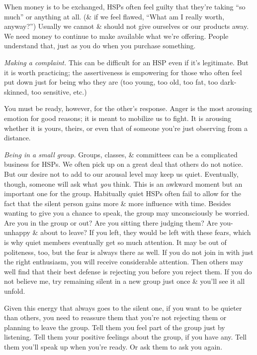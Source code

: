 \documentclass{article}
\numberwithin{equation}{section}
\begin{document}
When money is to be exchanged, HSPs often feel guilty that they're taking ``so much'' or anything at all. (\& if we feel flawed, ``What am I really worth, anyway?'') Usually we cannot \& should not give ourselves or our products away. We need money to continue to make available what we're offering. People understand that, just as you do when you purchase something.

\textit{Making a complaint.} This can be difficult for an HSP even if it's legitimate. But it is worth practicing; the assertiveness is empowering for those who often feel put down just for being who they are (too young, too old, too fat, too dark-skinned, too sensitive, etc.)

You must be ready, however, for the other's response. Anger is the most arousing emotion for good reasons; it is meant to mobilize us to fight. It is arousing whether it is yours, theirs, or even that of someone you're just observing from a distance.

\textit{Being in a small group.} Groups, classes, \& committees can be a complicated business for HSPs. We often pick up on a great deal that others do not notice. But our desire not to add to our arousal level may keep us quiet. Eventually, though, someone will ask what \textit{you} think. This is an awkward moment but an important one for the group. Habitually quiet HSPs often fail to allow for the fact that the silent person gains more \& more influence with time. Besides wanting to give you a chance to speak, the group may unconsciously be worried. Are you in the group or out? Are you sitting there judging them? Are you-unhappy \& about to leave? If you left, they would be left with these fears, which is why quiet members eventually get so much attention. It may be out of politeness, too, but the fear is always there as well. If you do not join in with just the right enthusiasm, you will receive considerable attention. Then others may well find that their best defense is rejecting you before you reject them. If you do not believe me, try remaining silent in a new group just once \& you'll see it all unfold.

Given this energy that always goes to the silent one, if you want to be quieter than others, you need to reassure them that you're not rejecting them or planning to leave the group. Tell them you feel part of the group just by listening. Tell them your positive feelings about the group, if you have any. Tell them you'll speak up when you're ready. Or ask them to ask you again.
\end{document}
